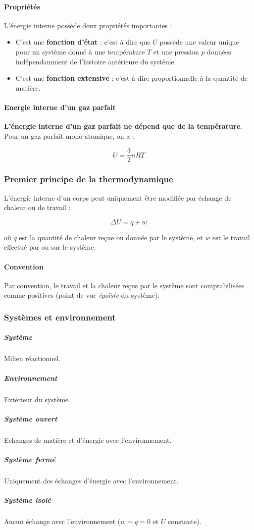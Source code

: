 \paragraph{Propriétés}

L'énergie interne possède deux propriétés importantes :

\begin{itemize}
 	\item C'est une \textbf{fonction d'état} : c'est à dire que $U$ possède une valeur unique
 				pour un système donné à une température $T$ et une pression $p$ données
 				indépendamment de l'histoire antérieure du système.
 	\item C'est une \textbf{fonction extensive} : c'est à dire proportionnelle
				à la quantité de matière.
\end{itemize}

\paragraph{Energie interne d'un gaz parfait}
\textbf{L'énergie interne d'un gaz parfait ne dépend que de la température}.  
Pour un gaz parfait mono-atomique, on a :

$$U = \frac{3}{2}nRT$$

\subsubsection{Premier principe de la thermodynamique}
L'énergie interne d'un corps peut uniquement être modifiée par échange de chaleur ou de travail :

$$\Delta U = q + w$$

où $q$ est la quantité de chaleur reçue ou donnée par le système, et $w$ est le travail
effectué par ou sur le système. 

\paragraph{Convention}
Par convention, le travail et la chaleur reçus par le système sont comptabilisées comme
positives (point de vue \emph{égoïste} du système).

\subsubsection{Systèmes et environnement}

\subparagraph{Système} Milieu réactionnel.
\subparagraph{Environnement} Extérieur du système.
\subparagraph{Système ouvert} Echanges de matière et d'énergie avec l'environnement.
\subparagraph{Système fermé} Uniquement des échanges d'énergie avec l'environnement.
\subparagraph{Système isolé} Aucun échange avec l'environnement ($w = q = 0$ et $U$ constante).

